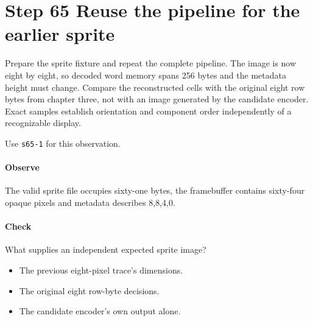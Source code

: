 \section{Step 65 Reuse the pipeline for the earlier sprite}\label{qoi-s65}
Prepare the sprite fixture and repeat the complete pipeline. The image is now eight by eight, so decoded word memory spans 256 bytes and the metadata height must change. Compare the reconstructed cells with the original eight row bytes from chapter three, not with an image generated by the candidate encoder. Exact samples establish orientation and component order independently of a recognizable display.

Use \texttt{s65-1} for this observation.

\paragraph{Observe} The valid sprite file occupies sixty-one bytes, the framebuffer contains sixty-four opaque pixels and metadata describes 8,8,4,0.

\paragraph{Check} What supplies an independent expected sprite image?
\begin{itemize}
  \item[A.] The previous eight-pixel trace’s dimensions.
  \item[B.] The original eight row-byte decisions.
  \item[C.] The candidate encoder’s own output alone.
\end{itemize}
